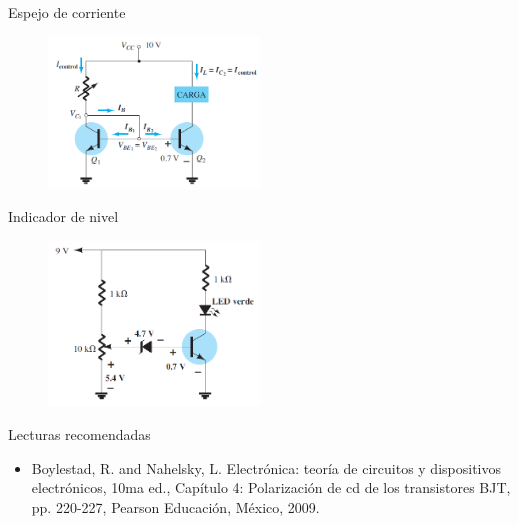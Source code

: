 \documentclass[t,aspectratio=169]{beamer}
\begin{document}
\begin{frame}{Espejo de corriente}

\begin{figure}[H]
    \centering
    \includegraphics[width=0.5\textwidth]{figuras/aplicaciones_9_espejo.png}
\end{figure}

\end{frame}


\begin{frame}{Indicador de nivel}

\begin{figure}[H]
    \centering
    \includegraphics[width=0.5\textwidth]{figuras/aplicaciones_10_indicador_nivel.png}
\end{figure}

\end{frame}


\begin{frame}{Lecturas recomendadas}

\begin{itemize}
    \item Boylestad, R. and Nahelsky, L. Electrónica: teoría de circuitos y dispositivos electrónicos, 10ma ed., Capítulo 4: Polarización de cd de los transistores BJT, pp. 220-227, Pearson Educación, México, 2009.
\end{itemize}

\end{frame}
\end{document}
